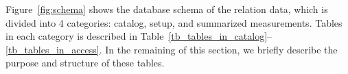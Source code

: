 





Figure~\ref{fig:schema} shows the database schema of the relation data, which is divided into 4 categories: catalog, setup, and summarized measurements. Tables in each category is described in Table~\ref{tb_tables_in_catalog}--\ref{tb_tables_in_access}. In the remaining of this section, we briefly describe the purpose and structure of these tables. 

